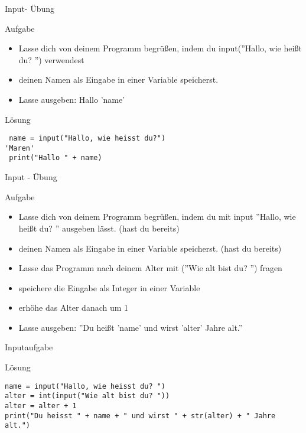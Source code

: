 \begin{frame}[fragile]{Input- Übung}   
\begin{block}{Aufgabe}
\begin{itemize}


\item Lasse dich von deinem Programm begrüßen, indem du  input(''Hallo, wie heißt du? '') verwendest
\item deinen Namen als Eingabe in einer Variable speicherst. 
\item Lasse ausgeben: Hallo 'name'
\end{itemize}
\end{block}
\pause{}
\begin{exampleblock}{Lösung}
\begin{lstlisting}
 name = input("Hallo, wie heisst du?")
'Maren'
 print("Hallo " + name)
\end{lstlisting}
\end{exampleblock}
\end{frame}

\begin{frame}[fragile]{Input - Übung}   
\begin{block}{Aufgabe}
	\begin{itemize}
		\item Lasse dich von deinem Programm begrüßen, indem du mit input ''Hallo, wie heißt du? '' ausgeben lässt. (hast du bereits)
		\item deinen Namen als Eingabe in einer Variable speicherst. (hast du bereits)
		\item Lasse das Programm nach deinem Alter mit (''Wie alt bist du? '') fragen
		\item speichere die Eingabe als Integer in einer Variable 
		\item erhöhe das Alter danach um 1
		\item Lasse ausgeben: ''Du heißt 'name' und wirst 'alter' Jahre alt.''
	\end{itemize}
\end{block}
\end{frame}

\begin{frame}[fragile]{Inputaufgabe}
\begin{exampleblock}{Lösung}
	\begin{lstlisting}
name = input("Hallo, wie heisst du? ")
alter = int(input("Wie alt bist du? "))
alter = alter + 1
print("Du heisst " + name + " und wirst " + str(alter) + " Jahre alt.")
	\end{lstlisting}
\end{exampleblock}
\end{frame}

